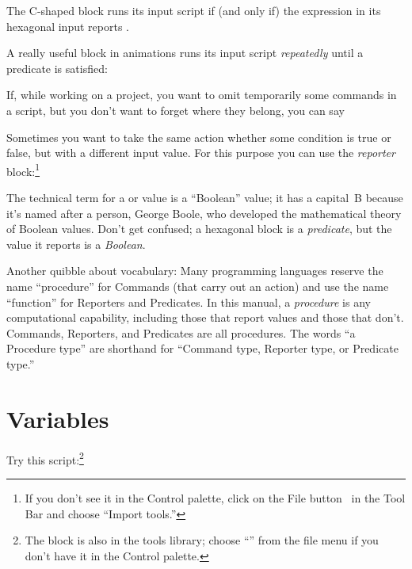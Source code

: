 \documentclass{report}
\begin{document}

The C-shaped  block runs its input script if (and only if) the expression in its hexagonal input reports .\nopagebreak


A really useful block in animations runs its input script \emph{repeatedly} until a predicate is satisfied:\nopagebreak


If, while working on a project, you want to omit temporarily some commands in a script, but you don't want to forget where they belong, you can say\nopagebreak


Sometimes you want to take the same action whether some condition is true or false, but with a different input value. For this purpose you can use the \emph{reporter}  block:\footnote{\onehalfspacing If you don't see it in the Control palette, click on the File button~ in the Tool Bar and choose ``Import tools.''}\nopagebreak


The technical term for a  or  value is a ``Boolean'' value; it has a capital~B because it's named after a person, George Boole, who developed the mathematical theory of Boolean values. Don't get confused; a hexagonal block is a \emph{predicate}, but the value it reports is a \emph{Boolean}.

Another quibble about vocabulary: Many programming languages reserve the name ``procedure'' for Commands (that carry out an action) and use the name ``function'' for Reporters and Predicates. In this manual, a \emph{procedure} is any computational capability, including those that report values and those that don't. Commands, Reporters, and Predicates are all procedures. The words ``a Procedure type'' are shorthand for ``Command type, Reporter type, or Predicate type.''

\section{Variables}

Try this script:\footnote{The  block is also in the tools library; choose ``'' from the file menu if you don't have it in the Control palette.}\nopagebreak
\end{document}
